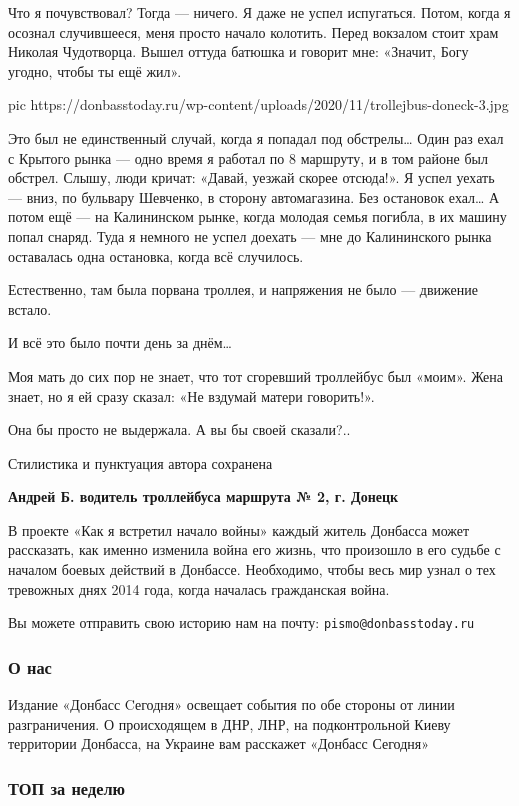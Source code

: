 Что я почувствовал? Тогда --- ничего. Я даже не успел испугаться. Потом,
когда я осознал случившееся, меня просто начало колотить. Перед вокзалом
стоит храм Николая Чудотворца. Вышел оттуда батюшка и говорит мне:
«Значит, Богу угодно, чтобы ты ещё жил».

\ifcmt
pic https://donbasstoday.ru/wp-content/uploads/2020/11/trollejbus-doneck-3.jpg
\fi

Это был не единственный случай, когда я попадал под обстрелы… Один раз
ехал с Крытого рынка --- одно время я работал по 8 маршруту, и в том районе
был обстрел. Слышу, люди кричат: «Давай, уезжай скорее отсюда!». Я успел
уехать --- вниз, по бульвару Шевченко, в сторону автомагазина. Без остановок
ехал… А потом ещё --- на Калининском рынке, когда молодая семья погибла, в
их машину попал снаряд. Туда я немного не успел доехать --- мне до
Калининского рынка оставалась одна остановка, когда всё случилось.

Естественно, там была порвана троллея, и напряжения не было --- движение
встало.

И всё это было почти день за днём…

Моя мать до сих пор не знает, что тот сгоревший троллейбус был «моим».
Жена знает, но я ей сразу сказал: «Не вздумай матери говорить!».

Она бы просто не выдержала. А вы бы своей сказали?..

Стилистика и пунктуация автора сохранена

\textbf{Андрей Б. водитель троллейбуса маршрута № 2, г. Донецк}

В проекте «Как я встретил начало войны» каждый житель Донбасса может
рассказать, как именно изменила война его жизнь, что произошло в его
судьбе с началом боевых действий в Донбассе. Необходимо, чтобы весь мир
узнал о тех тревожных днях 2014 года, когда началась гражданская война.

Вы можете отправить свою историю нам на почту: \verb|pismo@donbasstoday.ru|

\subsubsection{О нас}

Издание «Донбасс Cегодня» освещает события по обе стороны от линии
разграничения. О происходящем в ДНР, ЛНР, на подконтрольной Киеву территории
Донбасса, на Украине вам расскажет «Донбасс Сегодня»

\subsubsection{ТОП за неделю}

